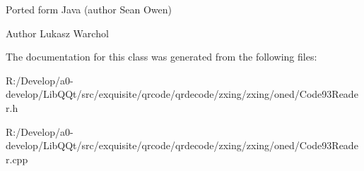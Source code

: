 Ported form Java (author Sean Owen) \begin{DoxyAuthor}{Author}
Lukasz Warchol 
\end{DoxyAuthor}


The documentation for this class was generated from the following files\+:\begin{DoxyCompactItemize}
\item 
R\+:/\+Develop/a0-\/develop/\+Lib\+Q\+Qt/src/exquisite/qrcode/qrdecode/zxing/zxing/oned/Code93\+Reader.\+h\item 
R\+:/\+Develop/a0-\/develop/\+Lib\+Q\+Qt/src/exquisite/qrcode/qrdecode/zxing/zxing/oned/Code93\+Reader.\+cpp\end{DoxyCompactItemize}
